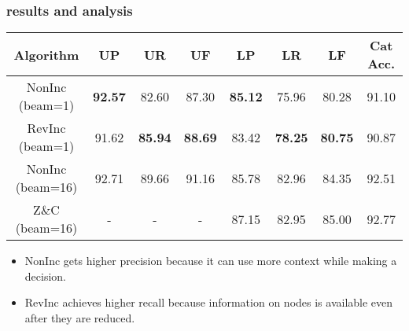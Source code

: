 \documentclass[10pt]{beamer}
\begin{document}
\begin{frame}
    \frametitle{results and analysis}
    \begingroup
    \scriptsize
    \begin{center}
    \begin{table}
    \caption{Performance on the development data\footnote{`U' stands for unlabaled and `L' stands for labeles. `P', `R' and `F' are precision, recall and F-score respectively.}.}
        \begin{table}[h]
            \begin{tabular}{cccccccc}
                \toprule
                Algorithm        & UP
                                                  & UR             & UF             & LP             & LR             & LF             & Cat Acc. \\
                \midrule
                NonInc (beam=1)  & \textbf{92.57} & 82.60          & 87.30          & \textbf{85.12} & 75.96          & 80.28          & 91.10 \\
                RevInc (beam=1)  & 91.62          & \textbf{85.94} & \textbf{88.69} & 83.42          & \textbf{78.25} & \textbf{80.75} & 90.87 \\
                \midrule
                NonInc (beam=16) & 92.71          & 89.66          & 91.16          & 85.78          & 82.96          & 84.35          & 92.51 \\
                Z\&C (beam=16)   & -              & -              & -              & 87.15          & 82.95          & 85.00          & 92.77 \\
                \bottomrule
            \end{tabular}
        \end{table}
    \end{table}
    \end{center}
    \endgroup
    \smallskip

    \begin{itemize}
        \item NonInc gets higher precision because it can use more context while making a decision.
        \item RevInc achieves higher recall because information on nodes is available even after they are reduced.
    \end{itemize}
\end{frame}
\end{document}
